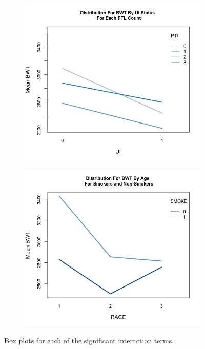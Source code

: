 \begin{figure}[!htb]
        \begin{subfigure}[b]{0.4\textwidth}   
            \centering 
            \includegraphics[width=\linewidth]{Images/PtlvsUi_Magda.png}
        \end{subfigure}
        \quad
        \begin{subfigure}[b]{0.4\textwidth}   
            \centering 
            \includegraphics[width=\linewidth]{Images/RacevsSmoke_Magda.png}
        \end{subfigure}
        \caption[ The average and standard deviation of critical parameters ]
        {\small Box plots for each of the significant interaction terms.} 
        \label{fig:interactionplots}
    \end{figure}

